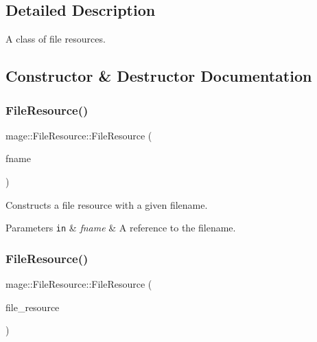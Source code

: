 \subsection{Detailed Description}
A class of file resources. 

\subsection{Constructor \& Destructor Documentation}
\hypertarget{classmage_1_1_file_resource_ab126d9301d81c55b2aaacff86437e2d4}{}\label{classmage_1_1_file_resource_ab126d9301d81c55b2aaacff86437e2d4} 
\subsubsection{\texorpdfstring{File\+Resource()}{FileResource()}\hspace{0.1cm}{\footnotesize\ttfamily [1/2]}}
{\footnotesize\ttfamily mage\+::\+File\+Resource\+::\+File\+Resource (\begin{DoxyParamCaption}\item[{const wstring \&}]{fname }\end{DoxyParamCaption})}

Constructs a file resource with a given filename.


\begin{DoxyParams}[1]{Parameters}
\mbox{\tt in}  & {\em fname} & A reference to the filename. \\
\hline
\end{DoxyParams}
\hypertarget{classmage_1_1_file_resource_a59d2da1beaff989a3a351e60986f559d}{}\label{classmage_1_1_file_resource_a59d2da1beaff989a3a351e60986f559d} 
\subsubsection{\texorpdfstring{File\+Resource()}{FileResource()}\hspace{0.1cm}{\footnotesize\ttfamily [2/2]}}
{\footnotesize\ttfamily mage\+::\+File\+Resource\+::\+File\+Resource (\begin{DoxyParamCaption}\item[{const \hyperlink{classmage_1_1_file_resource}{File\+Resource} \&}]{file\+\_\+resource }\end{DoxyParamCaption})\hspace{0.3cm}{\ttfamily [default]}}

